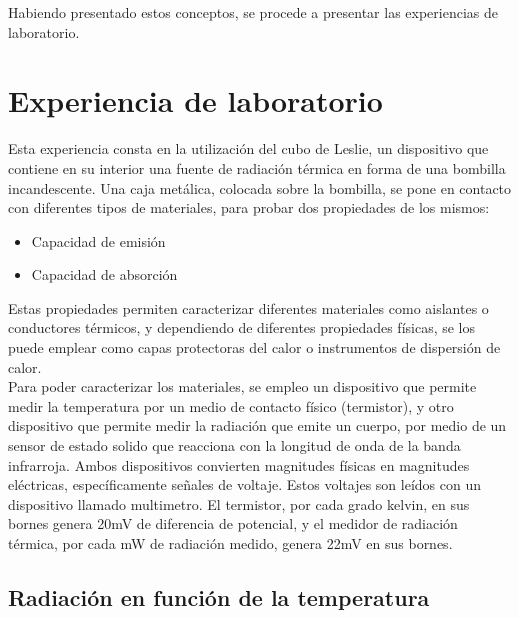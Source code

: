 \documentclass[a4paper,12pt]{report}
\begin{document}
  Habiendo presentado estos conceptos, se procede a presentar las experiencias de laboratorio.

\chapter{Experiencia de laboratorio}
  Esta experiencia consta en la utilización del cubo de Leslie, un dispositivo que contiene en su interior una fuente
  de radiación térmica en forma de una bombilla incandescente. Una caja metálica, colocada sobre la bombilla, se pone
  en contacto con diferentes tipos de materiales, para probar dos propiedades de los mismos:
  \begin{itemize}
    \item Capacidad de emisión
    \item Capacidad de absorción
  \end{itemize}

  Estas propiedades permiten caracterizar diferentes materiales como aislantes o conductores térmicos, y dependiendo de
  diferentes propiedades físicas, se los puede emplear como capas protectoras del calor o instrumentos de dispersión de
  calor.\\

  Para poder caracterizar los materiales, se empleo un dispositivo que permite medir la temperatura por un medio de
  contacto físico (termistor), y otro dispositivo que permite medir la radiación que emite un cuerpo, por medio de un
  sensor de estado solido que reacciona con la longitud de onda de la banda infrarroja. Ambos dispositivos convierten
  magnitudes físicas en magnitudes eléctricas, específicamente señales de voltaje. Estos voltajes son leídos con un
  dispositivo llamado multimetro. El termistor, por cada grado kelvin, en sus bornes genera 20mV de diferencia de
  potencial, y el medidor de radiación térmica, por cada mW de radiación medido, genera 22mV en sus bornes.

  \section{Radiación en función de la temperatura}

  \begin{center}
  \end{center}
\end{document}
